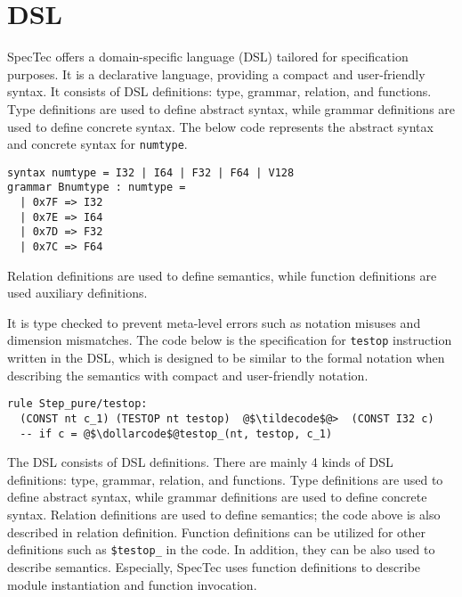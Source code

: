 
\chapter{DSL}
\label{ch:dsl}
\noindent


SpecTec offers a domain-specific language (DSL) tailored for specification
purposes.
It is a declarative language, providing a compact and user-friendly syntax.
It consists of DSL definitions: type, grammar, relation, and functions.
Type definitions are used to define abstract syntax, while grammar definitions
are used to define concrete syntax.
The below code represents the abstract syntax and concrete syntax for
\texttt{numtype}.
\begin{lstlisting}[style=dsl]
syntax numtype = I32 | I64 | F32 | F64 | V128
grammar Bnumtype : numtype =
  | 0x7F => I32
  | 0x7E => I64
  | 0x7D => F32
  | 0x7C => F64
\end{lstlisting}
Relation definitions are used to define semantics, while function definitions
are used auxiliary definitions.

It is type checked to prevent meta-level errors such as notation misuses and
dimension mismatches. The code below is the specification for \texttt{testop}
instruction written in the DSL, which is designed to be similar to the formal
notation when describing the semantics with compact and user-friendly
notation.
\begin{lstlisting}[style=dsl]
  rule Step_pure/testop:
  (CONST nt c_1) (TESTOP nt testop)  @$\tildecode$@>  (CONST I32 c)
  -- if c = @$\dollarcode$@testop_(nt, testop, c_1)
\end{lstlisting}


The DSL consists of DSL definitions.
There are mainly 4 kinds of DSL definitions: type, grammar, relation, and
functions.
Type definitions are used to define abstract syntax, while grammar definitions
are used to define concrete syntax.
Relation definitions are used to define semantics; the code above is also
described in relation definition.
Function definitions can be utilized for other definitions such as
\texttt{\$testop\_} in the code.
In addition, they can be also used to describe semantics.
Especially, SpecTec uses function definitions to describe module instantiation
and function invocation.
